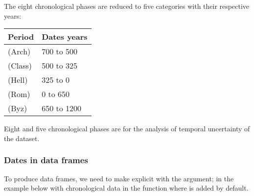 \documentclass[a4paper,12pt,english]{sphinxhowto}
\begin{document}

The eight chronological phases are reduced to five categories with their respective years:


\begin{savenotes}\sphinxattablestart
\raggedright
\begin{tabulary}{\linewidth}[t]{|T|T|}
\hline
\sphinxstyletheadfamily 
Period
&\sphinxstyletheadfamily 
Dates years
\\
\hline
{}  (Arch)
&
\sphinxhyphen{}700 to \sphinxhyphen{}500
\\
\hline
{}  (Class)
&
\sphinxhyphen{}500 to \sphinxhyphen{}325
\\
\hline
{}  (Hell)
&
\sphinxhyphen{}325 to 0
\\
\hline
{}  (Rom)
&
0 to 650
\\
\hline
{}  (Byz)
&
650 to 1200
\\
\hline
\end{tabulary}
\par
\sphinxattableend\end{savenotes}

Eight\sphinxhyphen{} and five chronological phases are for the analysis of temporal uncertainty of the  dataset.



\subsubsection{Dates in data frames}
\label{\detokenize{Time:dates-in-data-frames}}
To produce data frames, we need to make explicit with the  argument; in the
example below with chronological data in the function where  is added by default.

\begin{sphinxVerbatim}[commandchars=\\\{\},formatcom=\footnotesize]
     
\end{sphinxVerbatim}
\end{document}
